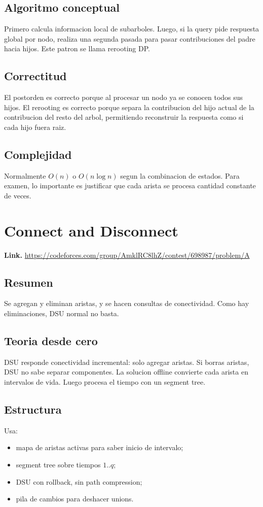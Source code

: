 \documentclass[10pt]{article}
\newcommand{\bigO}{O}
\begin{document}
\subsection*{Algoritmo conceptual}
Primero calcula informacion local de subarboles. Luego, si la query pide
respuesta global por nodo, realiza una segunda pasada para pasar contribuciones
del padre hacia hijos. Este patron se llama rerooting DP.

\subsection*{Correctitud}
El postorden es correcto porque al procesar un nodo ya se conocen todos sus
hijos. El rerooting es correcto porque separa la contribucion del hijo actual de
la contribucion del resto del arbol, permitiendo reconstruir la respuesta como
si cada hijo fuera raiz.

\subsection*{Complejidad}
Normalmente $\bigO(n)$ o $\bigO(n\log n)$ segun la combinacion de estados. Para
examen, lo importante es justificar que cada arista se procesa cantidad constante
de veces.

\clearpage
\section{Connect and Disconnect}
\textbf{Link.} \url{https://codeforces.com/group/AmklRC8lhZ/contest/698987/problem/A}

\subsection*{Resumen}
Se agregan y eliminan aristas, y se hacen consultas de conectividad. Como hay
eliminaciones, DSU normal no basta.

\subsection*{Teoria desde cero}
DSU responde conectividad incremental: solo agregar aristas. Si borras aristas,
DSU no sabe separar componentes. La solucion offline convierte cada arista en
intervalos de vida. Luego procesa el tiempo con un segment tree.

\subsection*{Estructura}
Usa:
\begin{itemize}[leftmargin=*]
\item mapa de aristas activas para saber inicio de intervalo;
\item segment tree sobre tiempos $1..q$;
\item DSU con rollback, sin path compression;
\item pila de cambios para deshacer unions.
\end{itemize}
\end{document}
